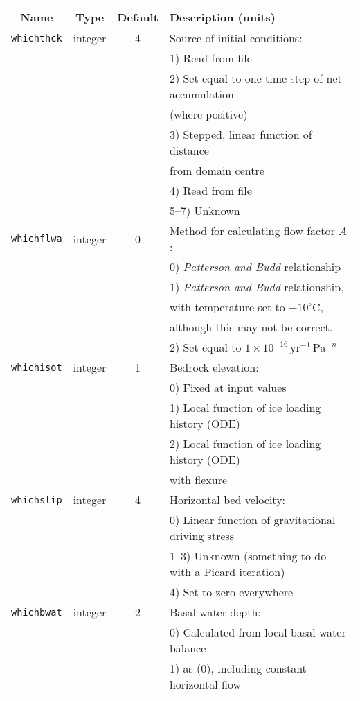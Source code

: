 \documentclass[11pt]{article}
\begin{document}
\begin{center}
\begin{tabular}{|c|c|c|l|}
\hline
Name & Type & Default & Description (units)\\
\hline
\hline
\texttt{whichthck} & integer & 4 & Source of initial conditions: \\
 & & & 1) Read from file \\
 & & & 2) Set equal to one time-step of net accumulation \\
 & & & (where positive) \\
 & & & 3) Stepped, linear function of distance \\
 & & & from domain centre \\
 & & & 4) Read from file \\
 & & & 5--7) Unknown \\
\hline
\texttt{whichflwa} & integer & 0 & Method for calculating flow factor $A$:\\
 & & & 0) \emph{Patterson and Budd} relationship \\
 & & & 1) \emph{Patterson and Budd} relationship, \\
 & & & with temperature set to $-10^{\circ}\mathrm{C}$, \\
 & & & although this may not be correct. \\
 & & & 2) Set equal to $1\times 10^{-16}\,\mathrm{yr}^{-1}
\,\mathrm{Pa}^{-n}$ \\
\hline
\texttt{whichisot} & integer & 1 & Bedrock elevation: \\
 & & & 0) Fixed at input values \\
 & & & 1) Local function of ice loading history (ODE) \\
 & & & 2) Local function of ice loading history (ODE) \\
 & & & with flexure \\
\hline
\texttt{whichslip} & integer & 4 & Horizontal bed velocity: \\
 & & & 0) Linear function of gravitational driving stress \\
 & & & 1--3) Unknown (something to do with a Picard iteration) \\
 & & & 4) Set to zero everywhere \\
\hline
\texttt{whichbwat} & integer & 2 & Basal water depth: \\
 & & & 0) Calculated from local basal water balance \\
 & & & 1) as (0), including constant horizontal flow \\

\end{tabular}
\end{center}
\end{document}
